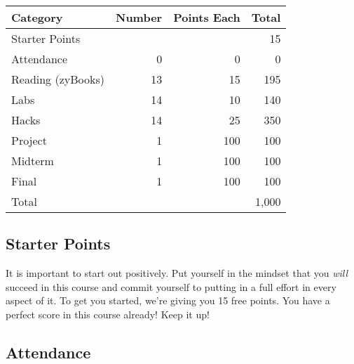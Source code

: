 \documentclass[12pt]{scrartcl}
\begin{document}
\begin{table}[h]
\centering



{\small
\setlength{\tabcolsep}{0.5em} %
\renewcommand{\arraystretch}{1.2}%

\begin{tabular}{lrrr}
\hline
\rowcolor{steelblue!50} Category & Number & Points Each & Total \\
\hline
\rowcolor{steelblue!5}  Starter Points    &    &     &  15 \\
\rowcolor{steelblue!10} Attendance        & 0  & 0   &   0 \\
\rowcolor{steelblue!5}  Reading (zyBooks) & 13 & 15  & 195 \\
\rowcolor{steelblue!10} Labs              & 14 & 10  & 140 \\
\rowcolor{steelblue!5} Hacks              & 14 & 25  & 350 \\
\rowcolor{steelblue!10} Project           & 1  & 100 & 100 \\
\rowcolor{steelblue!5}  Midterm           & 1  & 100 & 100 \\
\rowcolor{steelblue!10} Final             & 1  & 100 & 100 \\
\hline
Total  & & & 1,000 
\end{tabular}
}
\end{table}


\subsection{Starter Points}

It is important to start out positively.  Put yourself in the mindset
that you \emph{will} succeed in this course and commit yourself to
putting in a full effort in every aspect of it.  To get you started,
we're giving you 15 free points.  You have a perfect score in this
course already!  Keep it up!

\subsection{Attendance}
\end{document}
